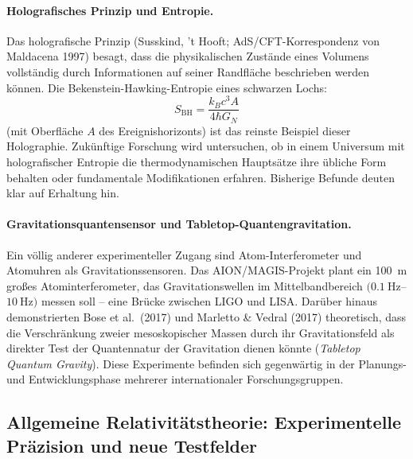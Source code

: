 ﻿\documentclass[12pt, a4paper]{report}
\theoremstyle{definition}
\theoremstyle{remark}
\begin{document}
\paragraph{Holografisches Prinzip und Entropie.}
Das holografische Prinzip (Susskind, 't Hooft; AdS/CFT-Korrespondenz von Maldacena
1997) besagt, dass die physikalischen Zustände eines Volumens vollständig durch
Informationen auf seiner Randfläche beschrieben werden können. Die Bekenstein-Hawking-Entropie
eines schwarzen Lochs:
\begin{equation}
  S_{\text{BH}} = \frac{k_B c^3 A}{4 \hbar G_N}
  \label{eq:bhentropie}
\end{equation}
(mit Oberfläche $A$ des Ereignishorizonts) ist das reinste Beispiel dieser
Holographie. Zukünftige Forschung wird untersuchen, ob in einem Universum mit
holografischer Entropie die thermodynamischen Hauptsätze ihre übliche Form
behalten oder fundamentale Modifikationen erfahren. Bisherige Befunde deuten
klar auf Erhaltung hin.

\paragraph{Gravitationsquantensensor und Tabletop-Quantengravitation.}
Ein völlig anderer experimenteller Zugang sind Atom-Interferometer und
Atomuhren als Gravitationssensoren. Das AION/MAGIS-Projekt plant ein
\SI{100}{\metre} großes Atominterferometer, das Gravitationswellen im
Mittelbandbereich $(\SI{0.1}{\hertz}$--$\SI{10}{\hertz})$ messen soll -- eine
Brücke zwischen LIGO und LISA. Darüber hinaus demonstrierten Bose et al.\ (2017)
und Marletto \& Vedral (2017) theoretisch, dass die Verschränkung zweier
mesoskopischer Massen durch ihr Gravitationsfeld als direkter Test der
Quantennatur der Gravitation dienen könnte (\emph{Tabletop Quantum Gravity}).
Diese Experimente befinden sich gegenwärtig in der Planungs- und
Entwicklungsphase mehrerer internationaler Forschungsgruppen.

\subsection{Allgemeine Relativitätstheorie: Experimentelle Präzision und
               neue Testfelder}
\end{document}
